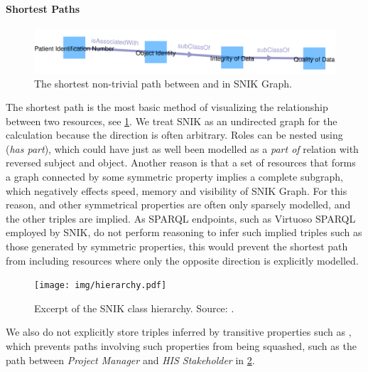 \documentclass[conference]{IEEEtran}
\begin{document}
\paragraph{Shortest Paths}
\begin{figure}[h!]
    \centering
    \includegraphics[width=\columnwidth]{img/path.png}
    \caption{The shortest non-trivial path between  and  in SNIK Graph.}
	\label{fig:path}
\end{figure}
\vspace{-3pt}
The shortest path is the most basic method of visualizing the relationship between two resources, see \cref{fig:path}.
We treat SNIK as an undirected graph for the calculation because the direction is often arbitrary.
Roles can be nested using  (\emph{has part}), which could have just as well been modelled as a \emph{part of} relation with reversed subject and object.
Another reason is that a set of resources that forms a graph connected by some symmetric property implies a complete subgraph, which negatively effects speed, memory and visibility of SNIK Graph.
For this reason,  and other symmetrical properties are often only sparsely modelled, and the other triples are implied.
As SPARQL endpoints, such as Virtuoso SPARQL employed by SNIK, do not perform reasoning to infer such implied triples such as those generated by symmetric properties, this would prevent the shortest path from including resources where only the opposite direction is explicitly modelled.%
\begin{figure}[h]
    \centering
    \texttt{[image: img/hierarchy.pdf]}
    \caption{Excerpt of the SNIK class hierarchy. Source: \cite{snikposter}.}
	\label{fig:hierarchy}
\end{figure}
\vspace{-3pt}
We also do not explicitly store triples inferred by transitive properties such as , which prevents paths involving such properties from being squashed, such as the path between \emph{Project Manager} and \emph{HIS Stakeholder} in \cref{fig:hierarchy}.
\end{document}
